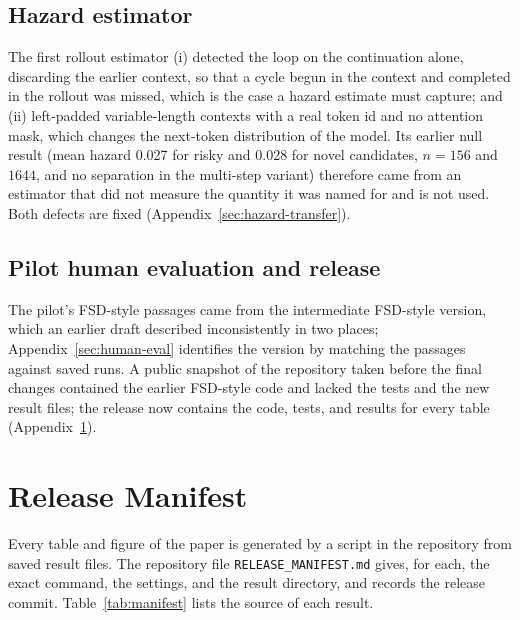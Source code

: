 \documentclass[11pt]{article}
\begin{document}
\subsection*{Hazard estimator}
The first rollout estimator (i) detected the loop on the continuation alone, discarding the earlier context, so that a cycle begun in the context and completed in the rollout was missed, which is the case a hazard estimate must capture; and (ii) left-padded variable-length contexts with a real token id and no attention mask, which changes the next-token distribution of the model. Its earlier null result (mean hazard 0.027 for risky and 0.028 for novel candidates, $n{=}156$ and $1644$, and no separation in the multi-step variant) therefore came from an estimator that did not measure the quantity it was named for and is not used. Both defects are fixed (Appendix~\ref{sec:hazard-transfer}).

\subsection*{Pilot human evaluation and release}
The pilot's FSD-style passages came from the intermediate FSD-style version, which an earlier draft described inconsistently in two places; Appendix~\ref{sec:human-eval} identifies the version by matching the passages against saved runs. A public snapshot of the repository taken before the final changes contained the earlier FSD-style code and lacked the tests and the new result files; the release now contains the code, tests, and results for every table (Appendix~\ref{sec:reproducibility}).

\section{Release Manifest}
\label{sec:reproducibility}

Every table and figure of the paper is generated by a script in the repository from saved result files. The repository file \texttt{RELEASE\_\allowbreak{}MANIFEST.md} gives, for each, the exact command, the settings, and the result directory, and records the release commit. Table~\ref{tab:manifest} lists the source of each result.
\end{document}

